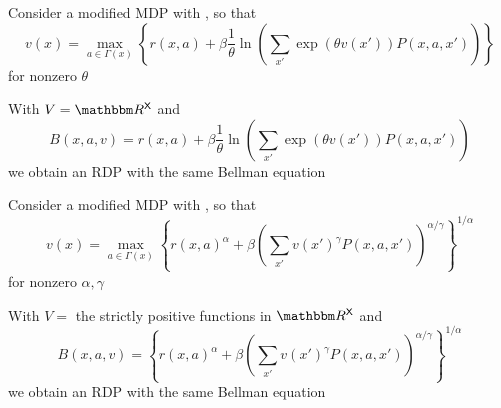 \documentclass[dvipsnames]{beamer}
\begin{document}
\begin{frame}
    
    \Eg Consider a modified MDP with , so that
    \begin{equation*}
        v(x) = \max_{a \in \Gamma(x)}
            \left\{
                r(x, a) + \beta \frac{1}{\theta} \ln 
                \left(
                    \sum_{x'} \exp(\theta v(x')) P(x, a, x')
                \right)
            \right\}
    \end{equation*}
    for nonzero $\theta$

    \vspace{0.5em}
    \vspace{0.5em}
    With $V = \RR^\Xsf$ and 
    \begin{equation*}
        B(x, a, v) =    
            r(x, a) + \beta \frac{1}{\theta} \ln 
            \left(
                \sum_{x'} \exp(\theta v(x')) P(x, a, x')
            \right)
    \end{equation*}
    we obtain an RDP with the same Bellman equation

\end{frame}



\begin{frame}
    
    \Eg Consider a modified MDP with , so that
    \begin{equation*}
        v(x) = \max_{a \in \Gamma(x)}
        \left\{
            r(x, a)^\alpha + \beta 
                \left(
                    \sum_{x'} v(x')^\gamma P(x,a, x')
                \right)^{\alpha / \gamma}
        \right\}^{1/\alpha}
    \end{equation*}
    for nonzero $\alpha, \gamma$

    \vspace{0.5em}
    \vspace{0.5em}
    With $V = $ the strictly positive functions in $\RR^\Xsf$ and 
    \begin{equation*}
        B(x, a, v) =    
        \left\{
            r(x, a)^\alpha + \beta 
                \left(
                    \sum_{x'} v(x')^\gamma P(x,a, x')
                \right)^{\alpha / \gamma}
        \right\}^{1/\alpha}
    \end{equation*}
    we obtain an RDP with the same Bellman equation

\end{frame}
\end{document}
